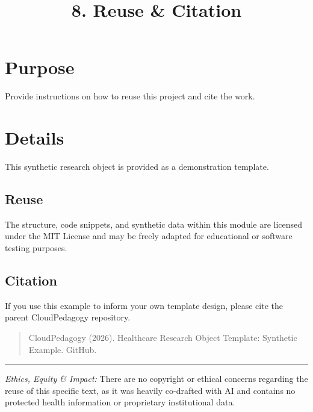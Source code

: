 \documentclass[
]{report}
\title{8. Reuse \& Citation}
\author{}
\date{}
\renewcommand*\contentsname{Table of contents}
\newcommand\contentsname{Table of contents}
\begin{document}
\maketitle

\renewcommand*\contentsname{Table of contents}
{
\hypersetup{linkcolor=}
\setcounter{tocdepth}{2}
\tableofcontents
}

\chapter{Purpose}\label{purpose}

Provide instructions on how to reuse this project and cite the work.

\chapter{Details}\label{details}

This synthetic research object is provided as a demonstration template.

\section{Reuse}\label{reuse}

The structure, code snippets, and synthetic data within this module are
licensed under the MIT License and may be freely adapted for educational
or software testing purposes.

\section{Citation}\label{citation}

If you use this example to inform your own template design, please cite
the parent CloudPedagogy repository.

\begin{quote}
CloudPedagogy (2026). Healthcare Research Object Template: Synthetic
Example. GitHub.
\end{quote}

\begin{center}\rule{0.5\linewidth}{0.5pt}\end{center}

\begin{tcolorbox}[enhanced jigsaw, opacitybacktitle=0.6, rightrule=.15mm, opacityback=0, toptitle=1mm, leftrule=.75mm, colframe=quarto-callout-note-color-frame, bottomtitle=1mm, left=2mm, colback=white, colbacktitle=quarto-callout-note-color!10!white, titlerule=0mm, title=\textcolor{quarto-callout-note-color}{\faInfo}\hspace{0.5em}{AI Capability Checkpoint}, breakable, arc=.35mm, coltitle=black, bottomrule=.15mm, toprule=.15mm]

\emph{Ethics, Equity \& Impact:} There are no copyright or ethical
concerns regarding the reuse of this specific text, as it was heavily
co-drafted with AI and contains no protected health information or
proprietary institutional data.

\end{tcolorbox}
\end{document}
